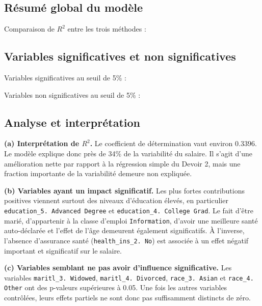 \documentclass[12pt,letterpaper]{article}
\begin{document}
\subsection{Résumé global du modèle}



Comparaison de $R^2$ entre les trois méthodes :


\subsection{Variables significatives et non significatives}

Variables significatives au seuil de 5\% :


Variables non significatives au seuil de 5\% :


\subsection{Analyse et interprétation}

\textbf{(a) Interprétation de $R^2$.}
Le coefficient de détermination vaut environ $0.3396$.
Le modèle explique donc près de 34\% de la variabilité du salaire.
Il s'agit d'une amélioration nette par rapport à la régression simple du Devoir 2, mais une fraction importante de la variabilité demeure non expliquée.

\textbf{(b) Variables ayant un impact significatif.}
Les plus fortes contributions positives viennent surtout des niveaux d'éducation élevés, en particulier \texttt{education\_5. Advanced Degree} et \texttt{education\_4. College Grad}.
Le fait d'être marié, d'appartenir à la classe d'emploi \texttt{Information}, d'avoir une meilleure santé auto-déclarée et l'effet de l'âge demeurent également significatifs.
À l'inverse, l'absence d'assurance santé (\texttt{health\_ins\_2. No}) est associée à un effet négatif important et significatif sur le salaire.

\textbf{(c) Variables semblant ne pas avoir d'influence significative.}
Les variables \texttt{maritl\_3. Widowed}, \texttt{maritl\_4. Divorced}, \texttt{race\_3. Asian} et \texttt{race\_4. Other} ont des p-valeurs supérieures à 0.05.
Une fois les autres variables contrôlées, leurs effets partiels ne sont donc pas suffisamment distincts de zéro.
\end{document}
